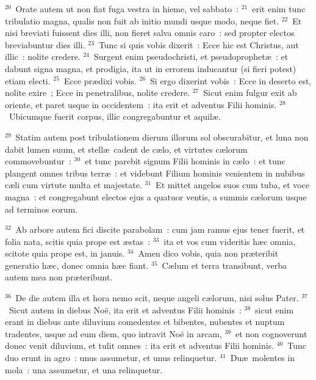 ${}^{20}$~Orate autem ut non fiat fuga vestra in hieme, vel sabbato~:
${}^{21}$~erit enim tunc tribulatio magna, qualis non fuit ab initio mundi usque modo, neque fiet.
${}^{22}$~Et nisi breviati fuissent dies illi, non fieret salva omnis caro~: sed propter electos breviabuntur dies illi.
${}^{23}$~Tunc si quis vobis dixerit~: Ecce hic est Christus, aut illic~: nolite credere.
${}^{24}$~Surgent enim pseudochristi, et pseudoprophet\ae~: et dabunt signa magna, et prodigia, ita ut in errorem inducantur (si fieri potest) etiam electi.
${}^{25}$~Ecce pr\ae dixi vobis.
${}^{26}$~Si ergo dixerint vobis~: Ecce in deserto est, nolite exire~; Ecce in penetralibus, nolite credere.
${}^{27}$~Sicut enim fulgur exit ab oriente, et paret usque in occidentem~: ita erit et adventus Filii hominis.
${}^{28}$~Ubicumque fuerit corpus, illic congregabuntur et aquil\ae .


${}^{29}$~Statim autem post tribulationem dierum illorum sol obscurabitur, et luna non dabit lumen suum, et stell\ae\ cadent de c\ae lo, et virtutes c\ae lorum commovebuntur~:
${}^{30}$~et tunc parebit signum Filii hominis in c\ae lo~: et tunc plangent omnes tribus terr\ae~: et videbunt Filium hominis venientem in nubibus c\ae li cum virtute multa et majestate.
${}^{31}$~Et mittet angelos suos cum tuba, et voce magna~: et congregabunt electos ejus a quatuor ventis, a summis c\ae lorum usque ad terminos eorum.


${}^{32}$~Ab arbore autem fici discite parabolam~: cum jam ramus ejus tener fuerit, et folia nata, scitis quia prope est \ae stas~:
${}^{33}$~ita et vos cum videritis h\ae c omnia, scitote quia prope est, in januis.
${}^{34}$~Amen dico vobis, quia non pr\ae teribit generatio h\ae c, donec omnia h\ae c fiant.
${}^{35}$~C\ae lum et terra transibunt, verba autem mea non pr\ae teribunt.


${}^{36}$~De die autem illa et hora nemo scit, neque angeli c\ae lorum, nisi solus Pater.
${}^{37}$~Sicut autem in diebus No\"e, ita erit et adventus Filii hominis~:
${}^{38}$~sicut enim erant in diebus ante diluvium comedentes et bibentes, nubentes et nuptum tradentes, usque ad eum diem, quo intravit No\"e in arcam,
${}^{39}$~et non cognoverunt donec venit diluvium, et tulit omnes~: ita erit et adventus Filii hominis.
${}^{40}$~Tunc duo erunt in agro~: unus assumetur, et unus relinquetur.
${}^{41}$~Du\ae\ molentes in mola~: una assumetur, et una relinquetur.


